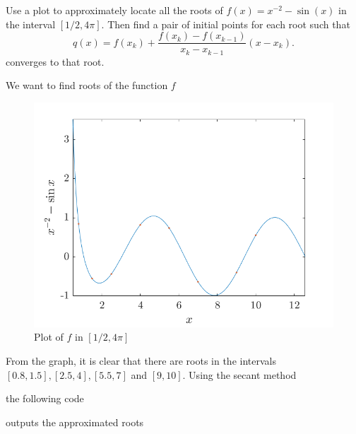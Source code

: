 \begin{statement}{1}
  Use a plot to approximately locate all the roots of
  $f(x) = x^{-2} - \sin(x)$
  in the interval $[1/2, 4 \pi]$.
  Then find a pair of initial points for each root such that
  \[
    q(x) = f(x_k) + \frac{f(x_k) - f(x_{k - 1})}{x_k - x_{k - 1}} (x - x_k).
  \]
  converges to that root.
\end{statement}

\begin{solution}
  We want to find roots of the function $f$
  \begin{figure}[H]
    \centering
    \includegraphics[scale=0.45]{graphics/plot-01.png}
    \caption{Plot of $f$ in $[1/2, 4 \pi]$}
  \end{figure}
  From the graph, it is clear that there are roots in the intervals
  $[0.8, 1.5], [2.5, 4], [5.5, 7]$ and $[9, 10]$.
  Using the secant method
  
  the following code
  
  outputs the approximated roots
  
\end{solution}
